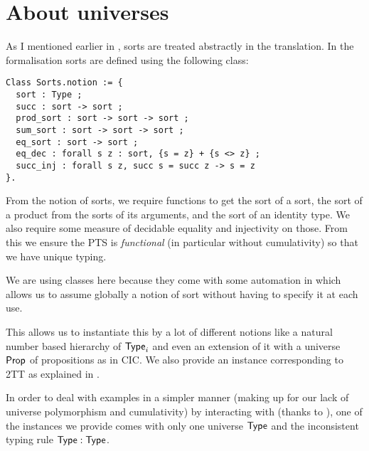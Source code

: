 

\section{About universes}

As I mentioned earlier in , sorts are treated
abstractly in the translation. In the formalisation sorts are defined using
the following class:
%
\begin{verbatim}
Class Sorts.notion := {
  sort : Type ;
  succ : sort -> sort ;
  prod_sort : sort -> sort -> sort ;
  sum_sort : sort -> sort -> sort ;
  eq_sort : sort -> sort ;
  eq_dec : forall s z : sort, {s = z} + {s <> z} ;
  succ_inj : forall s z, succ s = succ z -> s = z
}.
\end{verbatim}
%
From the notion of sorts, we require functions to get the sort of a sort,
the sort of a product from the sorts of its arguments, and the sort of an
identity type.
We also require some measure of decidable equality and injectivity on those.
From this we ensure the \acrshort{PTS} is \emph{functional} (in particular
without cumulativity) so that we have unique typing.

We are using classes here because they come with some automation in \Coq which
allows us to assume globally a notion of sort without having to specify it at
each use.

This allows us to instantiate this by a lot of different notions like a natural
number based hierarchy of \(\mathsf{Type}_i\) and even an extension of it with a
universe $\mathsf{Prop}$ of propositions as in \acrshort{CIC}.
We also provide an instance corresponding to \acrshort{2TT} as explained in
.

In order to deal with examples in a simpler manner (making up for our lack of
universe polymorphism and cumulativity) by interacting with \Coq (thanks to
\MetaCoq), one of the instances we provide comes with only one universe $\mathsf{Type}$
and the inconsistent typing rule $\mathsf{Type} : \mathsf{Type}$.

